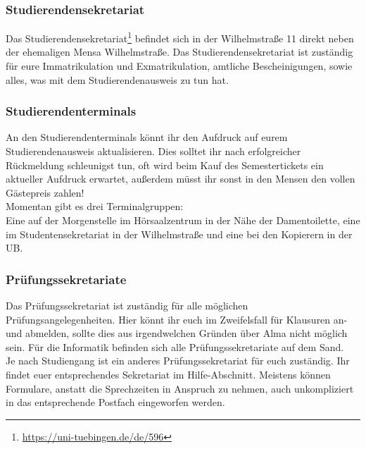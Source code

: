 \subsubsection*{Studierendensekretariat}
Das Studierendensekretariat\footnote{\url{https://uni-tuebingen.de/de/596}} befindet sich in der Wilhelmstraße 11 direkt neben der ehemaligen Mensa Wilhelmstraße. Das Studierendensekretariat ist zuständig für eure Immatrikulation und Exmatrikulation, amtliche Bescheinigungen, sowie alles, was mit dem Studierendenausweis zu tun hat.	%

\subsubsection*{Studierendenterminals}
An den Studierendenterminals könnt ihr den Aufdruck auf eurem
Studierendenausweis aktualisieren. Dies solltet ihr nach erfolgreicher Rückmeldung schleunigst tun, oft wird beim Kauf des Semestertickets ein aktueller Aufdruck erwartet, außerdem müsst ihr sonst in den Mensen
den vollen Gästepreis zahlen!\\
Momentan gibt es drei Terminalgruppen:\\
Eine auf der Morgenstelle im Hörsaalzentrum in der Nähe der Damentoilette,
eine im Studentensekretariat in der Wilhelmstraße und eine bei den Kopierern in der UB.

\subsubsection*{Prüfungssekretariate}
Das Prüfungssekretariat ist zuständig für alle möglichen Prüfungsangelegenheiten. Hier könnt ihr euch im Zweifelsfall für Klausuren an- und abmelden, sollte dies aus irgendwelchen Gründen über Alma nicht möglich sein. Für die Informatik befinden sich alle Prüfungssekretariate auf dem Sand.\\
Je nach Studiengang ist ein anderes Prüfungssekretariat für euch zuständig. Ihr findet euer entsprechendes Sekretariat im Hilfe-Abschnitt. Meistens können Formulare, anstatt die Sprechzeiten in Anspruch zu nehmen, auch unkompliziert in das entsprechende Postfach eingeworfen werden.

\vfill \pagebreak 
